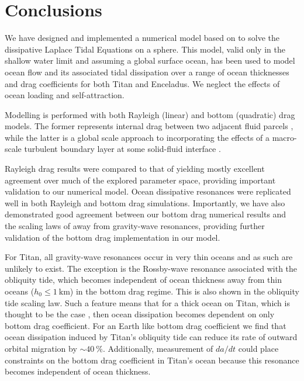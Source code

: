 \section{Conclusions}

We have designed and implemented a numerical model based on \citet{sears1995tidal} to solve the dissipative Laplace Tidal Equations on a sphere. This model, valid only in the shallow water limit and assuming a global surface ocean, has been used to model ocean flow and its associated tidal dissipation over a range of ocean thicknesses and drag coefficients for both Titan and Enceladus. We neglect the effects of ocean loading and self-attraction.

Modelling is performed with both Rayleigh (linear) and bottom (quadratic) drag models. The former represents internal drag between two adjacent fluid parcels \citep{neumann1968ocean}, while the latter is a global scale approach to incorporating the effects of a macro-scale turbulent boundary layer at some solid-fluid interface \citep{gill1982atmosphere}.

Rayleigh drag results were compared to that of \citet{matsuyama2014tidal} yielding mostly excellent agreement over much of the explored parameter space, providing important validation to our numerical model. Ocean dissipative resonances were replicated well in both Rayleigh and bottom drag simulations. Importantly, we have also demonstrated good agreement between our bottom drag numerical results and the scaling laws of \citet{chen2013tidal} away from gravity-wave resonances, providing further validation of the bottom drag implementation in our model.

For Titan, all gravity-wave resonances occur in very thin oceans and as such  are unlikely to exist. The exception is the Rossby-wave resonance associated with the obliquity tide, which becomes independent of ocean thickness away from thin oceans ($h_0 \leqslant\SI{1}{\kilo\metre}$) in the bottom drag regime. This is also shown in the \citet{chen2013tidal} obliquity tide scaling law. Such a feature means that for a thick ocean on Titan, which is thought to be the case \citep{sohl2014structural}, then ocean dissipation becomes dependent on only bottom drag coefficient. For an Earth like bottom drag coefficient we find that ocean dissipation induced by Titan's obliquity tide can reduce its rate of outward orbital migration by  $\sim\SI{40}{\percent}$. Additionally, measurement of $da/dt$ could place constraints on the bottom drag coefficient in Titan's ocean because this resonance becomes independent of ocean thickness. 

